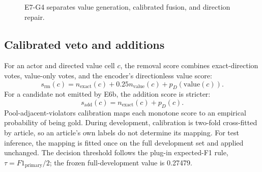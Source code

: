 \documentclass[sigconf,article,a4paper]{acmart}
\begin{document}
\begin{figure}[t]
  \centering
  \caption{E7-G4 separates value generation, calibrated fusion, and direction repair.}
  \label{fig:e7}
\end{figure}

\subsection{Calibrated veto and additions}

For an actor and directed value cell $c$, the removal score combines
exact-direction votes, value-only votes, and the encoder's directionless value
score:
\begin{equation}
s_{\mathrm{rm}}(c)=n_{\mathrm{exact}}(c)+0.25n_{\mathrm{value}}(c)
 +p_D(\mathrm{value}(c)).
\end{equation}
For a candidate not emitted by E6b, the addition score is stricter:
\begin{equation}
s_{\mathrm{add}}(c)=n_{\mathrm{exact}}(c)+p_D(c).
\end{equation}
Pool-adjacent-violators calibration maps each monotone score to an empirical
probability of being gold. During development, calibration is two-fold
cross-fitted by article, so an article's own labels do not determine its
mapping. For test inference, the mapping is fitted once on the full development
set and applied unchanged. The decision threshold follows the plug-in
expected-F1 rule, $\tau=F1_{\mathrm{primary}}/2$; the frozen full-development
value is 0.27479.
\end{document}
